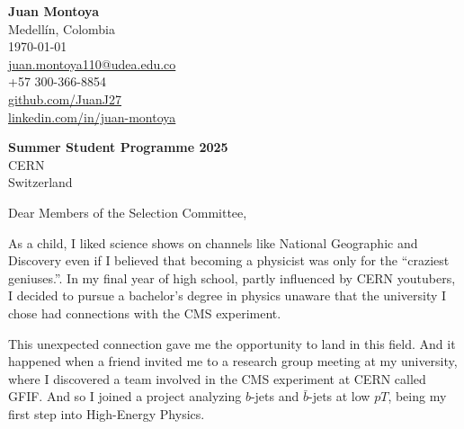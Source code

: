 \documentclass[11pt]{report}
\begin{document}
\begin{titlepage}
    
    
    \begin{minipage}[t]{0.95\textwidth}
        \hfill
        \raggedleft
        \textbf{Juan Montoya} \\
        Medellín, Colombia \\
        \today\\
        \href{mailto:juan.montoya110@udea.edu.co}{juan.montoya110@udea.edu.co} \\
        +57 300-366-8854 \\
        \href{https://github.com/JuanJ27}{github.com/JuanJ27} \\
        \href{https://www.linkedin.com/in/juan-montoya-68262071/}{linkedin.com/in/juan-montoya}
    \end{minipage}


\raggedright \textbf{Summer Student Programme 2025} \\ CERN \\ Switzerland

\vspace{0.7em}

\raggedright Dear Members of the Selection Committee,\\

\vspace{0.4em}

As a child, I liked science shows on channels like National Geographic and Discovery even if I believed that becoming a physicist was only for the “craziest geniuses.”. In my final year of high school, partly influenced by CERN youtubers, I decided to pursue a bachelor’s degree in physics unaware that the university I chose had connections with the CMS experiment.

\vspace{0.4em}

This unexpected connection gave me the opportunity to land in this field. And it happened when a friend invited me to a research group meeting at my university, where I discovered a team involved in the CMS experiment at CERN called GFIF. And so I joined a project analyzing \(b\)-jets and \(\bar{b}\)-jets at low $pT$, being my first step into High-Energy Physics.

\vspace{0.7em}


\end{titlepage}
\end{document}
